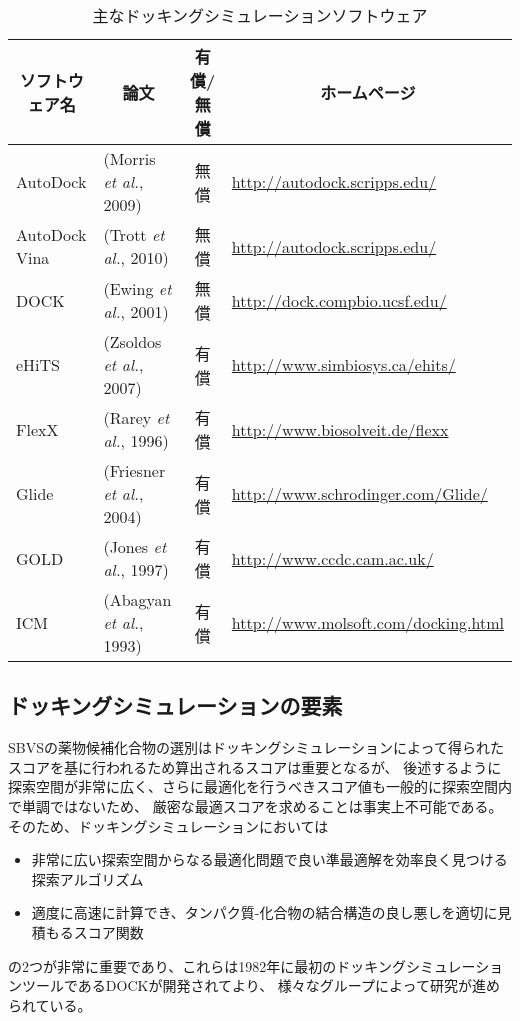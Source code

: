 \begin{table}[htb] \centering
	\caption{主なドッキングシミュレーションソフトウェア}
	\label{table:docking_tools_eg}
	\begin{tabular}{llcl}
	\hline
	\multicolumn{1}{c}{ソフトウェア名}	&\multicolumn{1}{c}{論文}			&\multicolumn{1}{c}{有償/無償}	&\multicolumn{1}{c}{ホームページ}	\\ \hline
	AutoDock					&(Morris {\it et al.}, 2009)\cite{Morris2009}												&無償									&\url{http://autodock.scripps.edu/}	\\ 
	AutoDock Vina				&(Trott  {\it et al.}, 2010)\cite{Trott2010}																											&無償									&\url{http://autodock.scripps.edu/}	\\ 
	DOCK							&(Ewing {\it et al.}, 2001)\cite{Ewing2001}																				&無償									&\url{http://dock.compbio.ucsf.edu/}	\\
	eHiTS							&(Zsoldos {\it et al.}, 2007)\cite{Zsoldos2007}											&有償									&\url{http://www.simbiosys.ca/ehits/}	\\
	FlexX							&(Rarey {\it et al.}, 1996)\cite{Rarey1996}																											&有償									&\url{http://www.biosolveit.de/flexx}	\\
	Glide							&(Friesner {\it et al.}, 2004)\cite{Friesner2004}													&有償									&\url{http://www.schrodinger.com/Glide/}	\\
	GOLD							&(Jones {\it et al.}, 1997)\cite{Jones1997}																				&有償									&\url{http://www.ccdc.cam.ac.uk/}	\\
	ICM								&(Abagyan {\it et al.}, 1993)\cite{Abagyan1993}																											&有償									&\url{http://www.molsoft.com/docking.html}	\\ \hline
	\end{tabular}
\end{table}


\subsection{ドッキングシミュレーションの要素}\label{subsec:docking_elements}
SBVSの薬物候補化合物の選別はドッキングシミュレーションによって得られたスコアを基に行われるため算出されるスコアは重要となるが、
後述するように探索空間が非常に広く、さらに最適化を行うべきスコア値も一般的に探索空間内で単調ではないため、
厳密な最適スコアを求めることは事実上不可能である。そのため、ドッキングシミュレーションにおいては
\begin{itemize}
\item 非常に広い探索空間からなる最適化問題で良い準最適解を効率良く見つける探索アルゴリズム
\item 適度に高速に計算でき、タンパク質-化合物の結合構造の良し悪しを適切に見積もるスコア関数
\end{itemize}
の2つが非常に重要であり、これらは1982年に最初のドッキングシミュレーションツールであるDOCK\cite{Kuntz1982}が開発されてより、
様々なグループによって研究が進められている。

